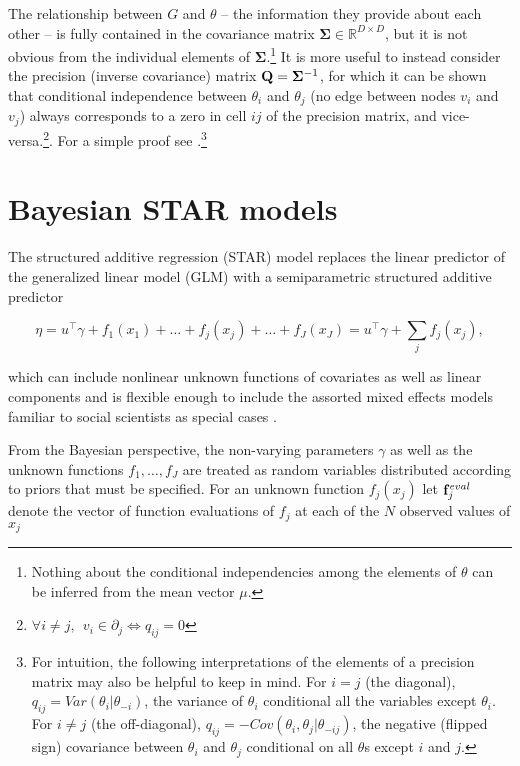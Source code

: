 The relationship between $G$ and $\theta$ -- the information they provide about each other -- is fully 
contained in the covariance matrix $\boldsymbol{\Sigma} \in \mathbb{R}^{D\times D}$, but it is not 
obvious from the individual elements of $\boldsymbol{\Sigma}$.\footnote{Nothing about the conditional 
independencies among the elements of $\theta$ can be inferred from the mean vector $\mu$.} It is 
more useful to instead consider the precision (inverse covariance) matrix 
$\mathbf{Q} =\boldsymbol{\Sigma}^{-1}$, for which it can be shown that conditional independence between 
$\theta_i$ and $\theta_j$ (no edge between nodes $v_i$ and $v_j$) always corresponds to a zero in 
cell $ij$ of the precision matrix, and vice-versa.\footnote{$\forall i \neq j, \:\: v_i \in \partial_j \iff q_{ij} = 0$}.  
For a simple proof see .\footnote{For intuition, the following interpretations of 
the elements of a precision matrix may also be helpful to keep in mind. For $i = j$ (the diagonal),  
$q_{ij} = Var(\theta_i | \theta_{-i})$, the variance of $\theta_i$ conditional all the variables except 
$\theta_i$. For $i \neq j$ (the off-diagonal), $q_{ij}  = -Cov(\theta_i, \theta_j | \theta_{-ij}) $, the negative 
(flipped sign) covariance between $\theta_i$ and $\theta_j$ conditional on all $\theta$s except $i$ and $j$.  }






\section{Bayesian STAR models}
\label{star}

The structured additive regression (STAR) model replaces the linear predictor of the generalized linear 
model (GLM) with a semiparametric structured additive predictor

\begin{equation*}
  \eta =  u^\intercal\gamma + f_1(x_1) + \ldots + f_j(x_j) + \ldots + f_J(x_J) =  u^\intercal\gamma + \sum_{j} f_j (x_j) ,
\end{equation*}

\noindent which can include nonlinear unknown functions of covariates as well as linear components 
and is flexible enough to include the assorted mixed effects models familiar to social scientists as 
special cases . 

From the Bayesian perspective, the non-varying parameters $\gamma$ as well as the unknown 
functions $f_1, \dots, f_J$ are treated as random variables distributed according to priors that must 
be specified. For an unknown function $f_j(x_j)$ let $\mathbf{f}_j^{eval}$ denote the vector of function 
evaluations of $f_j$ at each of the $N$ observed values of $x_j$ 

